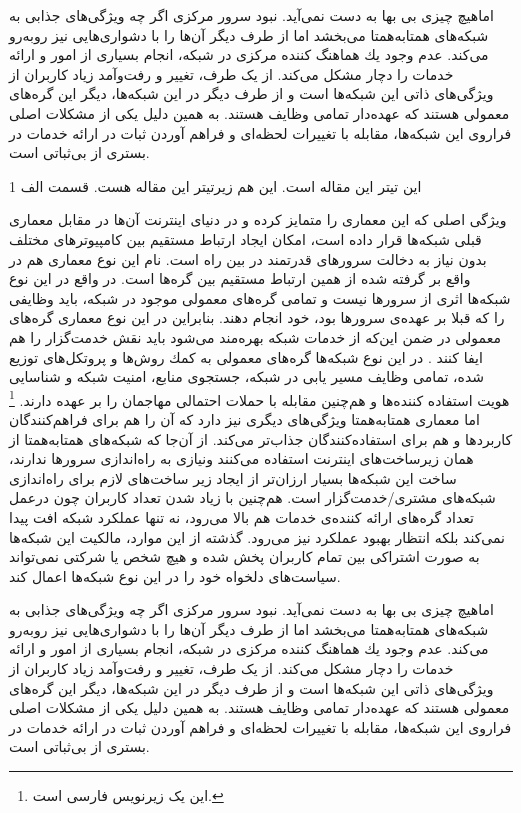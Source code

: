 \documentclass[12pt,twoside]{xepersian-magazine}
\begin{document}
\begin{article}{2}
اماهيچ چيزی بی‌ بها به دست نمی‌آید. نبود سرور مرکزی اگر چه  ويژگی‌های جذابی به شبکه‌های همتابه‌همتا می‌بخشد اما از طرف ديگر آن‌ها را با دشواری‌هايی نيز روبه‌رو می‌کند.  عدم وجود يك هماهنگ كننده مركزی در شبكه، انجام بسياری از امور و ارائه خدمات را  دچار مشكل می‌کند.  از يک طرف، تغيير و رفت‌وآمد زیاد کاربران از ويژگی‌های ذاتی اين شبکه‌ها است و از طرف ديگر در اين شبكه‌ها، ديگر اين گره‌های معمولی  هستند كه  عهده‌دار تمامی وظايف هستند. به همين دلیل يکی از مشکلات اصلی فراروی اين شبكه‌ها، مقابله با  تغييرات لحظه‌ای و فراهم آوردن ثبات در ارائه  خدمات در بستری از بی‌ثباتی است.
\end{article}

\articlesep

\begin{article}{2}
{این تیتر این مقاله است.}
{این هم زیرتیتر این مقاله هست.}
{قسمت الف}
{1}

\noindent{}
ويژگی اصلی که اين معماری را متمايز کرده و در دنيای اينترنت آن‌ها در مقابل معماری قبلی شبكه‌ها قرار داده است، امكان ايجاد ارتباط مستقيم  بين كامپيوترهای مختلف بدون نياز به دخالت سرورهای قدرتمند در بين راه است.  نام‌ اين نوع معماری هم در واقع بر گرفته شده از همین  ارتباط مستقیم بين گره‌ها است.  در واقع در اين نوع شبكه‌ها اثری از سرورها نيست و تمامی گره‌های معمولی موجود در شبكه، بايد وظايفی را که قبلا بر عهده‌ی سرورها بود، خود انجام دهند. بنابراين در اين نوع معماری گره‌های معمولی در ضمن اين‌که از خدمات شبکه بهره‌مند می‌شود بايد نقش خدمت‌گزار را هم ايفا کنند . در اين نوع شبکه‌ها گره‌های معمولی به كمك روش‌ها و پروتكل‌های توزيع شده، تمامی وظايف  مسير يابی در شبكه، جستجوی منابع، امنيت شبكه و شناسايی هويت استفاده كننده‌ها و هم‌چنين مقابله با حملات احتمالی مهاجمان را بر عهده دارند.
\footnote{این یک زیرنویس فارسی است.}
اما معماری همتابه‌همتا ويژگی‌های ديگری نيز دارد که آن را هم برای فراهم‌کنندگان کاربردها و هم برای استفاده‌کنندگان جذاب‌تر می‌کند.  از آن‌جا که شبکه‌های همتابه‌همتا از همان زيرساخت‌های اينترنت استفاده می‌کنند ونيازی به راه‌اندازی سرورها ندارند، ساخت اين شبكه‌ها بسيار ارزان‌تر از ايجاد زير ساخت‌های لازم برای راه‌اندازی شبكه‌های مشتری/خدمت‌گزار است.  هم‌چنين با زياد شدن تعداد کاربران چون درعمل تعداد گره‌های ارائه کننده‌ی خدمات هم بالا می‌رود، نه تنها عملكرد شبكه افت پيدا نمی‌كند بلكه انتظار بهبود عملکرد نيز می‌رود. گذشته از اين موارد، مالكيت اين شبكه‌ها به صورت اشتراكی بين تمام کاربران پخش شده و هيچ شخص يا شركتی نمی‌تواند سياست‌های دلخواه خود را در اين نوع شبكه‌ها اعمال کند.

اماهيچ چيزی بی‌ بها به دست نمی‌آید. نبود سرور مرکزی اگر چه  ويژگی‌های جذابی به شبکه‌های همتابه‌همتا می‌بخشد اما از طرف ديگر آن‌ها را با دشواری‌هايی نيز روبه‌رو می‌کند.  عدم وجود يك هماهنگ كننده مركزی در شبكه، انجام بسياری از امور و ارائه خدمات را  دچار مشكل می‌کند.  از يک طرف، تغيير و رفت‌وآمد زیاد کاربران از ويژگی‌های ذاتی اين شبکه‌ها است و از طرف ديگر در اين شبكه‌ها، ديگر اين گره‌های معمولی  هستند كه  عهده‌دار تمامی وظايف هستند. به همين دلیل يکی از مشکلات اصلی فراروی اين شبكه‌ها، مقابله با  تغييرات لحظه‌ای و فراهم آوردن ثبات در ارائه  خدمات در بستری از بی‌ثباتی است.


\end{article}
\end{document}
